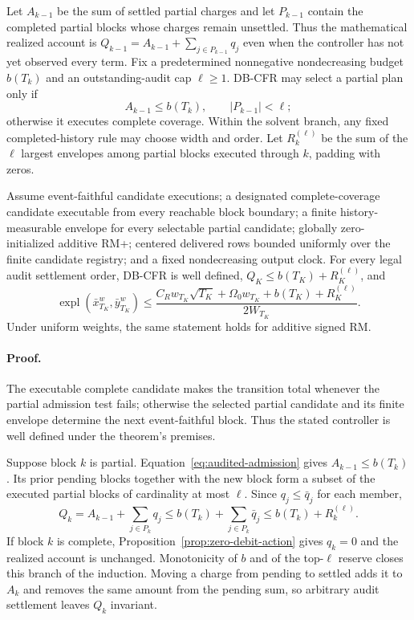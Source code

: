 Let $A_{k-1}$ be the sum of settled partial charges and let $P_{k-1}$ contain
the completed partial blocks whose charges remain unsettled.  Thus the
mathematical realized account is
$Q_{k-1}=A_{k-1}+\sum_{j\in P_{k-1}}q_j$ even when the controller has not yet
observed every term.  Fix a predetermined nonnegative nondecreasing budget
$b(T_k)$ and an outstanding-audit cap $\ell\ge1$.  DB-CFR may select a partial
plan only if
\begin{equation}
A_{k-1}\le b(T_k),\qquad |P_{k-1}|<\ell;
\label{eq:audited-admission}
\end{equation}
otherwise it executes complete coverage.  Within the solvent branch, any
fixed completed-history rule may choose width and order.  Let
$R_k^{(\ell)}$ be the sum of the $\ell$ largest envelopes among partial blocks
executed through $k$, padding with zeros.

\begin{theorem}
\label{thm:debit-controller}
Assume event-faithful candidate executions; a designated complete-coverage
candidate executable from every reachable block boundary; a finite
history-measurable envelope for every selectable partial candidate; globally
zero-initialized additive RM+; centered delivered rows bounded uniformly over
the finite candidate registry; and a fixed nondecreasing output clock.  For
every legal audit settlement order, DB-CFR is well defined,
$Q_K\le b(T_K)+R_K^{(\ell)}$, and
\begin{equation}
\boxed{
\operatorname{expl}(\bar x_{T_K}^w,\bar y_{T_K}^w)
\le
\frac{C_Rw_{T_K}\sqrt{T_K}+\Omega_0w_{T_K}+b(T_K)
+R_K^{(\ell)}}
{2W_{T_K}}.}
\label{eq:controller-bound}
\end{equation}
Under uniform weights, the same statement holds for additive signed RM.
\end{theorem}

\paragraph{Proof.}
The executable complete candidate makes the transition total whenever the
partial admission test fails; otherwise the selected partial candidate and
its finite envelope determine the next event-faithful block.  Thus the stated
controller is well defined under the theorem's premises.

Suppose block $k$ is partial.  Equation~\ref{eq:audited-admission} gives
$A_{k-1}\le b(T_k)$.  Its prior pending blocks together with the new block
form a subset of the executed partial blocks of cardinality at most $\ell$.
Since $q_j\le\bar q_j$ for each member,
\[
Q_k=A_{k-1}+\sum_{j\in P_k}q_j
\le b(T_k)+\sum_{j\in P_k}\bar q_j
\le b(T_k)+R_k^{(\ell)}.
\]
If block $k$ is complete, Proposition~\ref{prop:zero-debit-action} gives
$q_k=0$ and the realized account is unchanged.  Monotonicity of $b$ and of
the top-$\ell$ reserve closes this branch of the induction.  Moving a charge
from pending to settled adds it to $A_k$ and removes the same amount from the
pending sum, so arbitrary audit settlement leaves $Q_k$ invariant.

